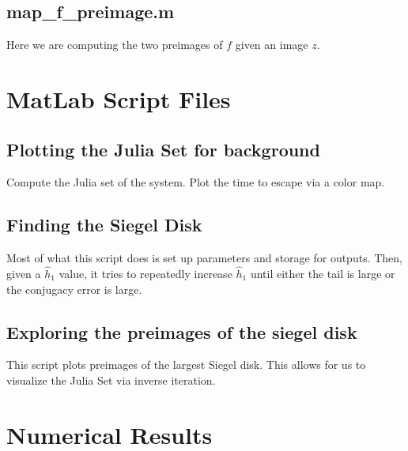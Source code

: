 \documentclass{article}
\theoremstyle{plain}
\theoremstyle{remark}
\begin{document}
\subsection{map\_f\_preimage.m}


Here we are computing the two preimages of $f$ given an image $z$. 

\section{MatLab Script Files}%

% 
\subsection{Plotting the Julia Set for background}


Compute the Julia set of the system. 
Plot the time to escape via a color map. 

\subsection{Finding the Siegel Disk}


Most of what this script does is set up parameters and storage for outputs. 
Then, given a $\hat{h}_1$ value, it tries to repeatedly increase $\hat{h}_1$ until either the tail is large or the conjugacy error is large. 

\subsection{Exploring the preimages of the siegel disk}


This script plots preimages of the largest Siegel disk. 
This allows for us to visualize the Julia Set via inverse iteration. 

\section{Numerical Results}%

\newpage
\end{document}
